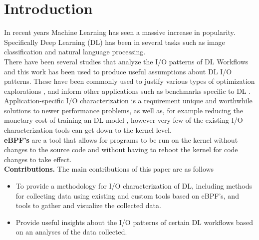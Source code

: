\documentclass[conference]{IEEEtran}
\begin{document}
\section{Introduction}
In recent years Machine Learning has seen a massive increase in popularity.
Specifically Deep Learning (DL) has been in several tasks such as image classification
and natural language processing.\\
There have been several studies that analyze the I/O patterns of DL Workflows and this work
has been used to produce useful assumptions about DL I/O patterns. These have been commonly used to
justify various types of optimization explorations \cite{LMDB, nvme, beegfsDL, bamboo}, and inform 
other applications such as benchmarks specific to DL \cite{TFbenchmark}. \\
Application-specific I/O characterization is a requirement unique and worthwhile solutions to
newer performance problems, as well as, for example reducing the monetary cost of training an 
DL model \cite{bamboo}, however very few of the existing I/O characterization tools
can get down to the kernel level.\\
\textbf{eBPF's} are a tool that allows for programs to be run on the kernel without changes to
the source code and without having to reboot the kernel for code changes to take effect.\\
\textbf{Contributions.} The main contributions of this paper are as follows
\begin{itemize}
    \item To provide a methodology for I/O characterization of DL, including methods for collecting data using existing and custom tools based on eBPF's, and tools to gather and visualize the collected data.
    \item Provide useful insights about the I/O patterns of certain DL workflows based on an analyses of the data collected.
\end{itemize}
\end{document}
